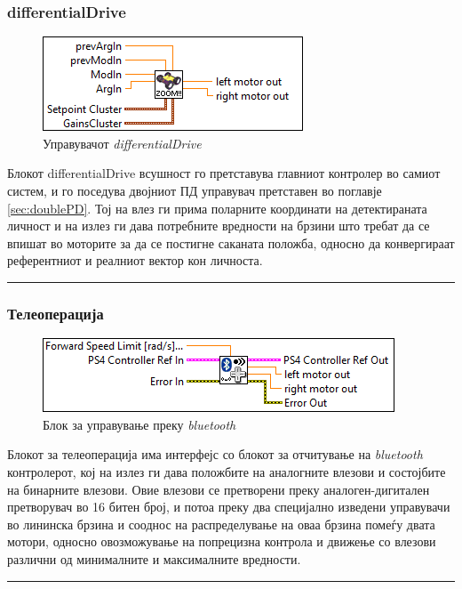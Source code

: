 \documentclass[11pt]{article}
\begin{document}
    \subsubsection{differentialDrive}
	    \begin{figure}[H]
	      \includegraphics[width=0.55\linewidth]{./images/differential_drive_border.png}
		    \caption{Управувачот \textit{differentialDrive}}
	      \label{fig:diffDrive}
	      \raggedright
	      \end{figure}
      Блокот differentialDrive всушност го претставува главниот контролер во самиот систем, и го поседува двојниот ПД управувач претставен во поглавје \ref{sec:doublePD}. Тој на влез ги прима поларните координати на детектираната личност и на излез ги дава потребните вредности на брзини што требат да се впишат во моторите за да се постигне саканата положба, односно да конвергираат референтниот и реалниот вектор кон личноста.
      \\
      \textcolor[RGB]{150,150,150}{\rule{\linewidth}{1.6pt}}

    \subsubsection{Телеоперација}
	    \begin{figure}[H]
	      \includegraphics[width=0.55\linewidth]{./images/teleop_tooltip_border.png}
		    \caption{Блок за управување преку \textit{bluetooth}}
	      \label{fig:teleop}
	      \raggedright
	      \end{figure}
	    Блокот за телеоперација има интерфејс со блокот за отчитување на \textit{bluetooth} контролерот, кој на излез ги дава положбите на аналогните влезови и состојбите на бинарните влезови. Овие влезови се претворени преку аналоген-дигитален претворувач во 16 битен број, и потоа преку два специјално изведени управувачи во лининска брзина и сооднос на распределување на оваа брзина помеѓу двата мотори, односно овозможување на попрецизна контрола и движење со влезови различни од минималните и максималните вредности.\\
      \textcolor[RGB]{150,150,150}{\rule{\linewidth}{1.6pt}}
\end{document}
